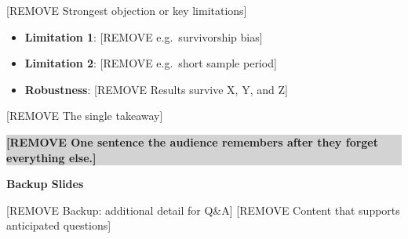 \documentclass[aspectratio=169,11pt]{beamer}
\newcommand{\transitionslide}[1]{%
  \begin{frame}[plain]
  \vfill\centering
  {\Large\color{navy}\textbf{#1}}
  \vfill
  \end{frame}
}
\newcommand{\takeaway}[1]{%
  \begin{center}
  \colorbox{lightgray}{\parbox{0.85\textwidth}{%
    \centering\color{navy}\textbf{#1}%
  }}
  \end{center}
}
\begin{document}
\begin{frame}{[REMOVE Strongest objection or key limitations]}
  \begin{itemize}
    \item \textbf{Limitation 1}: [REMOVE e.g.\ survivorship bias]
    \item \textbf{Limitation 2}: [REMOVE e.g.\ short sample period]
    \item \textbf{Robustness}: [REMOVE Results survive X, Y, and Z]
  \end{itemize}
\end{frame}

\begin{frame}{[REMOVE The single takeaway]}
  \vfill
  \takeaway{[REMOVE One sentence the audience remembers after they forget
  everything else.]}
  \vfill
\end{frame}

\appendix
\transitionslide{Backup Slides}

\begin{frame}{[REMOVE Backup: additional detail for Q\&A]}
  [REMOVE Content that supports anticipated questions]
\end{frame}
\end{document}
